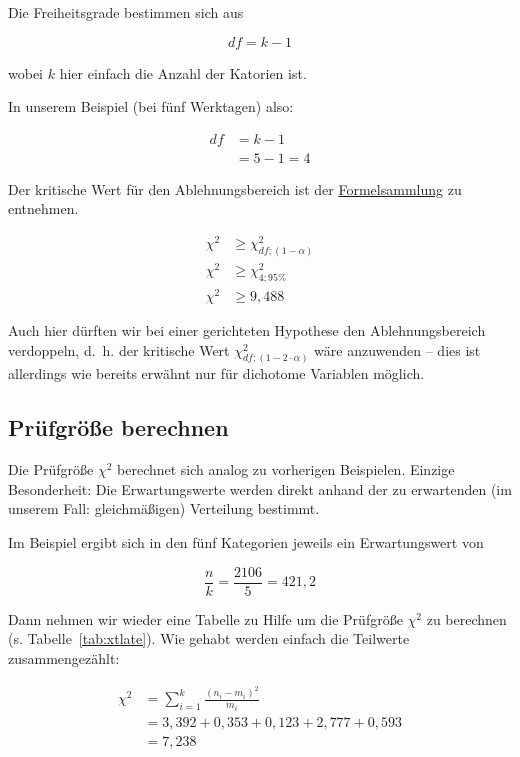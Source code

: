 \documentclass[
  11pt,
  ngerman,
  a4paper,
]{report}
\begin{document}
Die Freiheitsgrade bestimmen sich aus

\[
\mathit{df}=k-1
\label{eq:dfe}
\]

wobei \(k\) hier einfach die Anzahl der Katorien ist.

In unserem Beispiel (bei fünf Werktagen) also:

\[
\begin{aligned}
\mathit{df}&=k-1\\
&=5-1=4
\end{aligned}
\]

Der kritische Wert für den Ablehnungsbereich ist der \protect\hyperlink{formeln}{Formelsammlung} zu entnehmen.

\[
\begin{aligned}
\chi^2 &\geq \chi^2_{\mathit{df};(1-\alpha)}\\
\chi^2 &\geq \chi^2_{4;95\%}\\
\chi^2 &\geq 9{,}488
\end{aligned}
\]

Auch hier dürften wir bei einer gerichteten Hypothese den Ablehnungsbereich verdoppeln, d.~h. der kritische Wert \(\chi^2_{\mathit{df};(1-2\cdot \alpha)}\) wäre anzuwenden -- dies ist allerdings wie bereits erwähnt nur für dichotome Variablen möglich.

\hypertarget{pruxfcfgruxf6uxdfe-berechnen-5}{%
\subsection{Prüfgröße berechnen}\label{pruxfcfgruxf6uxdfe-berechnen-5}}

Die Prüfgröße \(\chi^2\) berechnet sich analog zu vorherigen Beispielen. Einzige Besonderheit: Die Erwartungswerte werden direkt anhand der zu erwartenden (im unserem Fall: gleichmäßigen) Verteilung bestimmt.

Im Beispiel ergibt sich in den fünf Kategorien jeweils ein Erwartungswert von

\[\frac{n}{k}=\frac{2106}{5}=421{,}2\]

Dann nehmen wir wieder eine Tabelle zu Hilfe um die Prüfgröße \(\chi^2\) zu berechnen (s. Tabelle~\ref{tab:xtlate}). Wie gehabt werden einfach die Teilwerte zusammengezählt:

\[
\begin{aligned}
\chi^2 &= \sum_{i=1}^{k}\frac{(n_{i}-m_{i})^{2}}{m_{i}}\\[4pt]
&=3{,}392 +  0{,}353 +  0{,}123 +  2{,}777 + 0{,}593\\
&=7{,}238
\end{aligned}
\]
\end{document}
